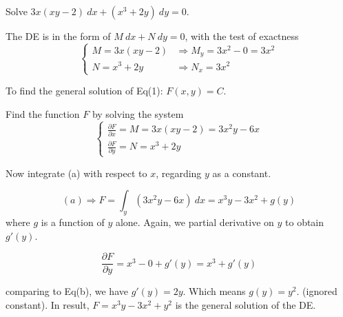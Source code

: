 \begin{example}
    Solve $3x(xy - 2)\> dx + (x^3 + 2y)\> dy = 0$.
\end{example}
\begin{solution}
    The DE is in the form of $M\> dx + N\> dy = 0$, with the test of exactness
    \[
        \begin{cases}
            M = 3x (xy - 2) &\Rightarrow M_y = 3x^2 - 0 = 3x^2 \\[0.75em]
            N = x^3 + 2y &\Rightarrow N_x = 3x^2 
        \end{cases}
    \]

    To find the general solution of Eq(1): $F(x, y) = C$.

    Find the function $F$ by solving the system 
    \[
        \begin{cases}
            \displaystyle \frac{\partial F}{\partial x} = M = 3x (xy - 2) = 3x^2y - 6x \\[1em]
            \displaystyle \frac{\partial F}{\partial y} = N = x^3 + 2y
        \end{cases}
    \]
    
    Now integrate (a) with respect to $x$, regarding $y$ as a constant.

    \[
        (a) \Rightarrow F = \int_{y} (3x^2y - 6x)\> dx = x^3y - 3x^2 + g(y) 
    \]
    where $g$ is a function of $y$ alone. Again, we partial derivative on $y$ to obtain $g'(y)$.

    \[
        \frac{\partial F}{\partial y} = x^3 - 0 + g'(y) = x^3 + g'(y)
    \]

    comparing to Eq(b), we have $g'(y) = 2y$. Which means $g(y) = y^2$. (ignored constant). 
    In result, $F = x^3y - 3x^2 + y^2$ is the general solution of the DE.
    

\end{solution}

